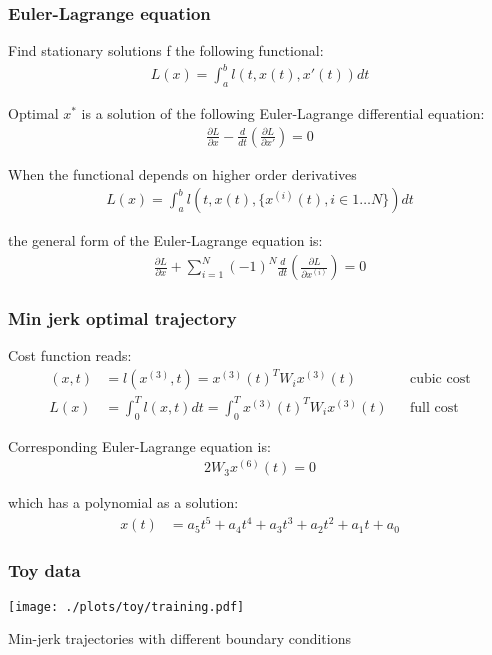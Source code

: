 \documentclass[xcolor=svgnames,table]{beamer}
\begin{document}
\begin{frame}
\frametitle{Euler-Lagrange equation}
Find stationary solutions f the following functional:
\begin{align}
L(x) = \int_a^b l(t, x(t), x'(t)) dt
\end{align}

Optimal $x^*$ is a solution of the following Euler-Lagrange differential equation:
\begin{align}
\frac{\partial L}{\partial x} - \frac{d}{dt} \left( \frac{\partial L}{\partial x'} \right) = 0
\end{align}

When the functional depends on higher order derivatives
\begin{align}
L(x) = \int_a^b l(t, x(t), \{x^{(i)}(t), i \in 1 \ldots N\}) dt
\end{align}

the general form of the Euler-Lagrange equation is:
\begin{align}
\frac{\partial L}{\partial x} + \sum_{i=1}^N (-1)^N \frac{d}{dt} \left( \frac{\partial L}{\partial x^{(i)}} \right) = 0
\end{align}
\end{frame}


\begin{frame}
\frametitle{Min jerk optimal trajectory}
Cost function reads:
\begin{align}
(x, t) &= l(x^{(3)}, t) = x^{(3)}(t)^T W_i x^{(3)}(t) &&\text{cubic cost} \\
L(x) 	&= \int_0^T  l(x, t) dt = \int_0^T x^{(3)}(t)^T W_i x^{(3)}(t) &&\text{full cost} 
\end{align}

Corresponding Euler-Lagrange equation is:
\begin{align}
2W_3x^{(6)}(t) = 0
\end{align}

which has a polynomial as a solution:
\begin{align}
x(t) &= a_5 t^5 + a_4 t^4 + a_3 t^3 + a_2 t^2 + a_1 t + a_0
\end{align}

\end{frame}

\begin{frame}
\frametitle{Toy data}
\begin{center}
\texttt{[image: ./plots/toy/training.pdf]}
\end{center}
Min-jerk trajectories with different boundary conditions
\end{frame}
\end{document}
